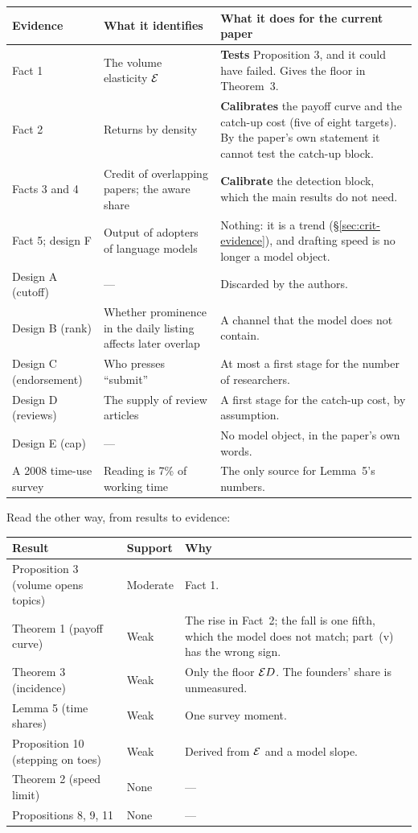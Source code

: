 \begin{center}\small
\begin{tabularx}{\textwidth}{@{}P{1.3in}P{1.85in}L@{}}
\toprule
Evidence & What it identifies & What it does for the current paper \\
\midrule
Fact 1 & The volume elasticity $\mathcal{E}$ & \textbf{Tests} Proposition 3, and it could have failed. Gives the floor in Theorem~3. \\
Fact 2 & Returns by density & \textbf{Calibrates} the payoff curve and the catch-up cost (five of eight targets). By the paper's own statement it cannot test the catch-up block. \\
Facts 3 and 4 & Credit of overlapping papers; the aware share & \textbf{Calibrate} the detection block, which the main results do not need. \\
Fact 5; design F & Output of adopters of language models & Nothing: it is a trend (\S\ref{sec:crit-evidence}), and drafting speed is no longer a model object. \\
Design A (cutoff) & --- & Discarded by the authors. \\
Design B (rank) & Whether prominence in the daily listing affects later overlap & A channel that the model does not contain. \\
Design C (endorsement) & Who presses ``submit'' & At most a first stage for the number of researchers. \\
Design D (reviews) & The supply of review articles & A first stage for the catch-up cost, by assumption. \\
Design E (cap) & --- & No model object, in the paper's own words. \\
A 2008 time-use survey & Reading is 7\% of working time & The only source for Lemma~5's numbers. \\
\bottomrule
\end{tabularx}
\end{center}

Read the other way, from results to evidence:

\begin{center}\small
\begin{tabularx}{\textwidth}{@{}P{2.3in}P{0.8in}L@{}}
\toprule
Result & Support & Why \\
\midrule
Proposition 3 (volume opens topics) & Moderate & Fact 1. \\
Theorem 1 (payoff curve) & Weak & The rise in Fact~2; the fall is one fifth, which the model does not match; part~(v) has the wrong sign. \\
Theorem 3 (incidence) & Weak & Only the floor $\mathcal{E} D$. The founders' share is unmeasured. \\
Lemma 5 (time shares) & Weak & One survey moment. \\
Proposition 10 (stepping on toes) & Weak & Derived from $\mathcal{E}$ and a model slope. \\
Theorem 2 (speed limit) & None & --- \\
Propositions 8, 9, 11 & None & --- \\
\bottomrule
\end{tabularx}
\end{center}

